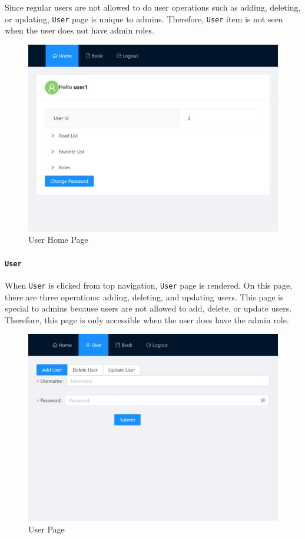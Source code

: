Since regular users are not allowed to do user operations such as adding, deleting, or updating, \texttt{User} page is unique to admins. Therefore, \texttt{User} item is not seen when the user does not have admin roles.

\begin{figure}[H]
  \centering
  \includegraphics[width=\textwidth]{img/front-end/homepage-user.png}
  \caption{User Home Page}
\end{figure}


\paragraph{\texttt{User}}

When \texttt{User} is clicked from top navigation, \texttt{User} page is rendered. On this page, there are three operations: adding, deleting, and updating users. This page is special to admins because users are not allowed to add, delete, or update users. Therefore, this page is only accessible when the user does have the admin role.

\begin{figure}[H]
  \centering
  \includegraphics[width=.85\textwidth]{img/front-end/user.png}
  \caption{User Page}
\end{figure}

